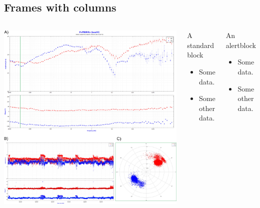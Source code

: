 \documentclass[11pt]{beamer}
\begin{document}
\subsection{Frames with columns}
\begin{frame}
    \begin{columns}[c] %
        \includegraphics[width = 1.\textwidth]{phd-isterre-poster-2023-fig.jpg}
        \begin{block}{A standard block}
            \begin{itemize}
                \item Some data.
                \item Some other data.
            \end{itemize}
        \end{block}

        \begin{alertblock}{An alertblock}
            \begin{itemize}
                \item Some data.
                \item Some other data.
            \end{itemize}
        \end{alertblock}
    \end{columns}
\end{frame}
\end{document}
